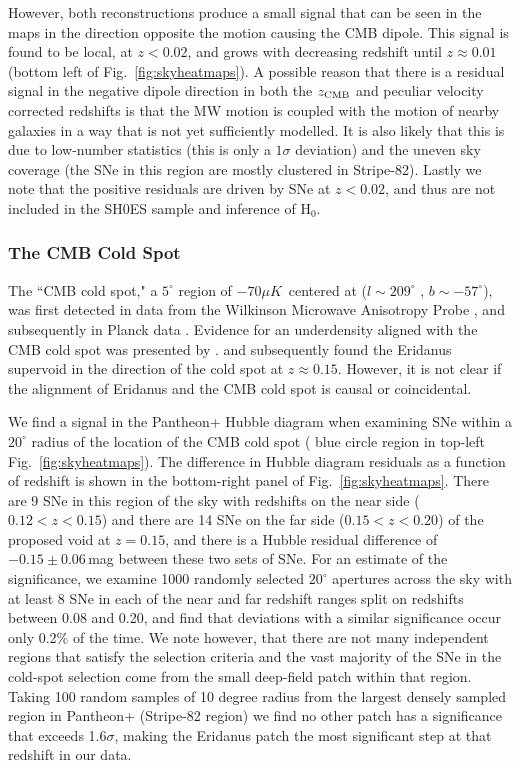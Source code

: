 \documentclass[twocolumn]{aastex63}
\begin{document}
However, both reconstructions produce a { small} signal that can be seen in the maps in the direction opposite the motion causing the CMB dipole. This signal is found to be local, at $z<0.02$, and grows with decreasing redshift until $z\approx0.01$ (bottom left of Fig.~\ref{fig:skyheatmaps}). A possible reason that there is a residual signal in the negative dipole direction in both the $z_{\rm CMB}$ and peculiar velocity corrected redshifts is that the MW motion is coupled with the motion of nearby galaxies in a way that is not yet sufficiently modelled.  { It is also likely that this is due  to low-number statistics (this is only a $1\sigma$ deviation) and the uneven sky coverage (the SNe in this region are mostly clustered in Stripe-82). Lastly we note that the positive residuals are driven by SNe at $z<0.02$, and thus are not included in the SH0ES \citep{SH0ES21} sample and inference of H$_0$.} 


\subsubsection{The CMB Cold Spot}
The ``CMB cold spot," a $5^\circ$ region of $-70\mu K$~centered at ($l\sim209^\circ$ , $b\sim -57^\circ$), was first detected in data from the Wilkinson Microwave Anisotropy Probe \citep{vielva2004,cruz06}, and subsequently in Planck data \citep{planckcold14}.
Evidence for an underdensity aligned with the CMB cold spot was
presented by \cite{Rudnick07}. \cite{szapudi2014cold} and \cite{kovacs22} subsequently found the Eridanus supervoid in the direction of the cold spot at $z \approx 0.15$. However, it is not clear if the alignment of Eridanus and the CMB cold spot is causal or coincidental.


We find a signal in the Pantheon+ Hubble diagram when examining SNe within a $20^\circ$ radius of the location of the CMB cold spot {({ blue circle region in} top-left Fig.~\ref{fig:skyheatmaps})}. The difference in Hubble diagram residuals as a function of redshift is shown in the bottom-right panel of Fig.~\ref{fig:skyheatmaps}. There are 9 SNe in this region of the sky with redshifts on the near side ($0.12<z<0.15$) and there are { 14} SNe on the far side ($0.15<z<0.20$) of the proposed void at $z=0.15$, and there is a Hubble residual difference of { $-0.15 \pm 0.06$}\,mag between these two sets of SNe. For an estimate of the significance, we examine 1000 randomly selected $20^\circ$ apertures across the sky with at least {  8 SNe in each of the near and far redshift ranges split on redshifts between 0.08 and 0.20, and find that deviations with a similar significance occur only 0.2\% of the time.  We note however, that there are not many independent regions that satisfy the selection criteria and the vast majority of the SNe in the cold-spot selection come from the small deep-field patch within that region. Taking 100 random samples of 10 degree radius from the largest densely sampled region in Pantheon+ (Stripe-82 region) we find no other patch has a significance that exceeds 1.6$\sigma$, making the Eridanus patch the most significant step at that redshift in our data.}
\end{document}
